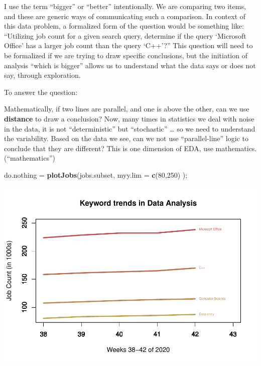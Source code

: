 \documentclass[
]{article}
\newenvironment{Shaded}{\begin{snugshade}}{\end{snugshade}}
\newcommand{\DataTypeTok}[1]{\textcolor[rgb]{0.13,0.29,0.53}{#1}}
\newcommand{\DecValTok}[1]{\textcolor[rgb]{0.00,0.00,0.81}{#1}}
\newcommand{\KeywordTok}[1]{\textcolor[rgb]{0.13,0.29,0.53}{\textbf{#1}}}
\newcommand{\NormalTok}[1]{#1}
\newcommand{\StringTok}[1]{\textcolor[rgb]{0.31,0.60,0.02}{#1}}
\begin{document}
I use the term ``bigger'' or ``better'' intentionally. We are comparing
two items, and these are generic ways of communicating such a
comparison. In context of this data problem, a formalized form of the
question would be something like: ``Utilizing job count for a given
search query, determine if the query `Microsoft Office' has a larger job
count than the query `C++'?'' This question will need to be formalized
if we are trying to draw specific conclusions, but the initiation of
analysis ``which is bigger'' allows us to understand what the data says
or does not say, through exploration.

To answer the question:

Mathematically, if two lines are parallel, and one is above the other,
can we use \textbf{distance} to draw a conclusion? Now, many times in
statistics we deal with noise in the data, it is not ``deterministic''
but ``stochastic'' \ldots{} so we need to understand the variability.
Based on the data we see, can we not use ``parallel-line'' logic to
conclude that they are different? This is one dimension of EDA, use
mathematics. (``mathematics'')

\begin{Shaded}
\begin{Highlighting}[]
\NormalTok{do.nothing =}\StringTok{ }\KeywordTok{plotJobs}\NormalTok{(jobs.subset, }\DataTypeTok{myy.lim =} \KeywordTok{c}\NormalTok{(}\DecValTok{80}\NormalTok{,}\DecValTok{250}\NormalTok{) );}
\end{Highlighting}
\end{Shaded}

\includegraphics{graphics/chunk-plotting-jobs-trends-microsoft-1.pdf}
\end{document}
